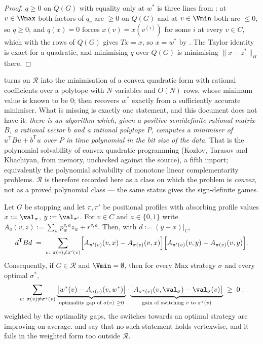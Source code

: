 \begin{proof}
$q\ge0$ on $Q(G)$ with equality only at $w^{\ast}$ is three lines from
: at $v\in\Vmax$ both factors of $q_v$ are
$\ge0$ on $Q(G)$ and at $v\in\Vmin$ both are $\le0$, so $q\ge0$; and
$q(x)=0$ forces $x(v)=x(v^{(i)})$ for some $i$ at every $v\in C$, which with
the rows of $Q(G)$ gives $Tx=x$, so $x=w^{\ast}$ by
. The Taylor identity is exact for a quadratic, and
minimising $q$ over $Q(G)$ is minimising $\|x-z^\ast\|_B$ there.
\end{proof}

\begin{remark}\label{vr:gap}
 turns  on $\mathcal R$ into the
minimisation of a convex quadratic form with rational coefficients over a
polytope with $N$ variables and $O(N)$ rows, whose minimum value is known to
be $0$;  then recovers $w^{\ast}$ exactly from a
sufficiently accurate minimiser. What is missing is exactly one statement,
and this document does not have it:
\emph{there is an algorithm which, given a positive semidefinite rational
matrix $B$, a rational vector $b$ and a rational polytope $P$, computes a
minimiser of $u^{\mathsf T}Bu+b^{\mathsf T}u$ over $P$ in time polynomial in
the bit size of the data.} That is the polynomial solvability of convex
quadratic programming (Kozlov, Tarasov and Khachiyan, from memory, unchecked
against the source), a fifth import; equivalently the polynomial
solvability of monotone linear complementarity problems. $\mathcal R$ is
therefore recorded here as a class on which the problem is \emph{convex},
not as a proved polynomial class --- the same status
 gives the sign-definite games.
\end{remark}

\begin{theorem}\label{vr:optdir}
Let $G$ be stopping and let $\pi,\pi'$ be positional profiles with
absorbing profile values $x:=\val_\pi$, $y:=\val_{\pi'}$. For $v\in C$ and
$a\in\{0,1\}$ write $A_a(v,z):=\sum_wp^{v,a}_wz_w+r^{v,a}$. Then, with
$d:=(y-x)|_{C}$,
\[
  d^{\mathsf T}Bd\;=\;\sum_{v:\ \pi(v)\ne\pi'(v)}
   \Bigl[A_{\pi'(v)}(v,x)-A_{\pi(v)}(v,x)\Bigr]
   \Bigl[A_{\pi'(v)}(v,y)-A_{\pi(v)}(v,y)\Bigr].
\]
Consequently, if $G\in\mathcal R$ and $\Vmin=\emptyset$, then for every Max
strategy $\sigma$ and every optimal $\sigma^{\ast}$,
\[
  \sum_{v:\ \sigma(v)\ne\sigma^{\ast}(v)}
  \underbrace{\bigl[w^{\ast}(v)-A_{\sigma(v)}(v,w^{\ast})\bigr]}_{\text{optimality gap of }\sigma(v)\ \ge0}
  \cdot
  \underbrace{\bigl[A_{\sigma^{\ast}(v)}(v,\val_\sigma)-\val_\sigma(v)\bigr]}_{\text{gain of switching }v\text{ to }\sigma^{\ast}(v)}
  \;\ge\;0 :
\]
weighted by the optimality gaps, the switches towards an optimal strategy
are improving on average.  and
 say that no such statement holds vertexwise, and it fails
in the weighted form too outside $\mathcal R$.
\end{theorem}

